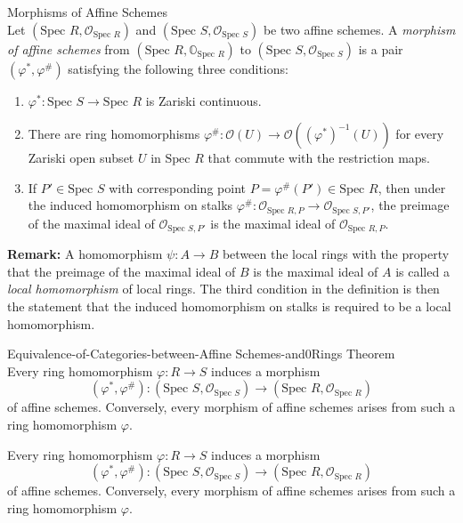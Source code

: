 \begin{definition}{Morphisms of Affine Schemes}\\
Let $(\text{Spec }R, \mathcal{O}_{\text{Spec }R})$ and $(\text{Spec }S, \mathcal{O}_{\text{Spec }S})$ be two affine schemes. A \textit{morphism of affine schemes} from $(\text{Spec }R, \mathbb{O}_{\text{Spec }R})$ to $(\text{Spec }S ,\mathcal{O}_{\text{Spec } S})$ is a pair $(\varphi^*, \varphi^\#)$ satisfying the following three conditions:
\begin{enumerate}
    \item $\varphi^*: \text{Spec }S \to \text{Spec }R$ is Zariski continuous.
    \item There are ring homomorphisms $\varphi^\#: \mathcal{O} (U) \to \mathcal{O} ((\varphi^*)^{-1} (U))$ for every Zariski open subset $U$ in $\text{Spec }R$ that commute with the restriction maps.
    \item If $P'\in \text{Spec }S$ with corresponding point $P= \varphi^\# (P') \in \text{Spec }R$, then under the induced homomorphism on stalks $\varphi^\# :\mathcal{O}_{\text{Spec }R,P} \to \mathcal{O}_{\text{Spec }S,P'}$, the preimage of the maximal ideal of $\mathcal{O}_{\text{Spec }S,P'}$ is the maximal ideal of $\mathcal{O} _{\text{Spec }R,P}$.
\end{enumerate}
\end{definition}

\noindent\textbf{Remark:} A homomorphism $\psi: A\to B$ between the local rings with the property that the preimage of the maximal ideal of $B$ is the maximal ideal of $A$ is called a \textit{local homomorphism} of local rings. The third condition in the definition is then the statement that the induced homomorphism on stalks is required to be a local homomorphism.

\begin{theorem}{Equivalence-of-Categories-between-Affine Schemes-and0Rings Theorem}\\
Every ring homomorphism $\varphi: R\to S$ induces a morphism
\[
(\varphi^* ,\varphi^\#): (\text{Spec }S, \mathcal{O}_{\text{Spec }S}) \to (\text{Spec }R ,\mathcal{O}_{\text{Spec }R})
\]
of affine schemes. Conversely, every morphism of affine schemes arises from such a ring homomorphism $\varphi$.
\end{theorem}


\begin{theorem}
Every ring homomorphism $\varphi: R \to S$ induces a morphism 
\[
(\varphi^*, \varphi^\#) : (\text{Spec } S, \mathcal{O}_{\text{Spec } S}) \to (\text{Spec } R, \mathcal{O}_{\text{Spec } R})
\]
of affine schemes. Conversely, every morphism of affine schemes arises from such a ring homomorphism $\varphi$.
\end{theorem}

